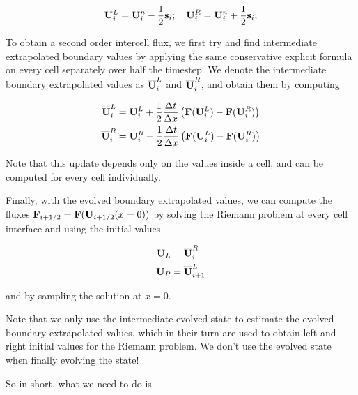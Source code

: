 \begin{equation}
	\mathbf{U}_i^L = \mathbf{U}_i^n - \frac{1}{2} \mathbf{s}_i; \quad 	\mathbf{U}_i^R = \mathbf{U}_i^n + \frac{1}{2} \mathbf{s}_i; 
\end{equation}


To obtain a second order intercell flux, we first try and find intermediate extrapolated boundary values by applying the same conservative explicit formula on every cell separately over half the timestep.
We denote the intermediate boundary extrapolated values as $\overline{\mathbf{U}}_i^L$ and $\overline{\mathbf{U}}_i^R$, and obtain them by computing

\begin{align}
	\overline{\mathbf{U}}_i^L &= \mathbf{U}_i^L + \frac{1}{2} \frac{\Delta t}{\Delta x} \left( \mathbf{F}(\mathbf{U}_i^L) - \mathbf{F}(\mathbf{U}_i^R) \right)\\
	\overline{\mathbf{U}}_i^R &= \mathbf{U}_i^R + \frac{1}{2} \frac{\Delta t}{\Delta x} \left( \mathbf{F}(\mathbf{U}_i^L) - \mathbf{F}(\mathbf{U}_i^R) \right)
\end{align}

Note that this update depends only on the values inside a cell, and can be computed for every cell individually.

Finally, with the evolved boundary extrapolated values, we can compute the fluxes $\mathbf{F}_{i + 1/2} = \mathbf{F}(\mathbf{U}_{i+1/2}(x = 0))$ by solving the Riemann problem at every cell interface and using the initial values

\begin{align}
	\mathbf{U}_L &= \overline{\mathbf{U}}_i^R\\
	\mathbf{U}_R &= \overline{\mathbf{U}}_{i+1}^L 
\end{align}

and by sampling the solution at $x = 0$.


Note that we only use the intermediate evolved state to estimate the evolved boundary extrapolated values, which in their turn are used to obtain left and right initial values for the Riemann problem.
We don't use the evolved state when finally evolving the state!

So in short, what we need to do is

